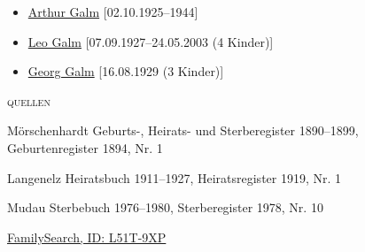 \begin{person}[
    surname = {Schüßler},
    givenname = {Margaretha},
    suffix = {1894--1978},
    label = {@I8@},
    filename = {Margaretha Schuessler (1894)}
    ]
\begin{itemize}
\item \hyperref[@I57@]{Arthur Galm} [02.10.1925--1944]
\item \hyperref[@I54@]{Leo Galm} [07.09.1927--24.05.2003 (4 Kinder)]
\item \hyperref[@I55@]{Georg Galm} [16.08.1929 (3 Kinder)]
\end{itemize}
\medbreak
\textsc{{quellen}}
\begin{enumerate}[label={[\arabic*]}]
\item Mörschenhardt Geburts-, Heirats- und Sterberegister 1890–1899, Geburtenregister 1894, Nr. 1
\item Langenelz Heiratsbuch 1911–1927, Heiratsregister 1919, Nr. 1
\item Mudau Sterbebuch 1976–1980, Sterberegister 1978, Nr. 10
\item \href{https://www.familysearch.org/tree/person/details/L51T-9XP}{FamilySearch, ID: L51T-9XP}
\end{enumerate}

\end{person}

